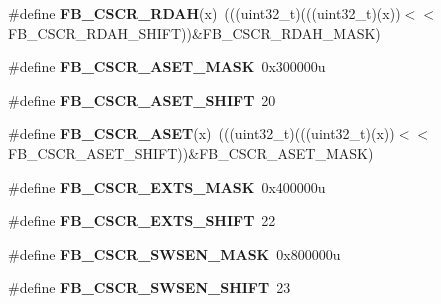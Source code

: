 \begin{DoxyCompactItemize}
\item 
\#define {\bfseries F\+B\+\_\+\+C\+S\+C\+R\+\_\+\+R\+D\+AH}(x)~(((uint32\+\_\+t)(((uint32\+\_\+t)(x))$<$$<$F\+B\+\_\+\+C\+S\+C\+R\+\_\+\+R\+D\+A\+H\+\_\+\+S\+H\+I\+FT))\&F\+B\+\_\+\+C\+S\+C\+R\+\_\+\+R\+D\+A\+H\+\_\+\+M\+A\+SK)\hypertarget{group__FB__Register__Masks_ga54849fb23896ad9ddd312de4bb8d0a09}{}\label{group__FB__Register__Masks_ga54849fb23896ad9ddd312de4bb8d0a09}

\item 
\#define {\bfseries F\+B\+\_\+\+C\+S\+C\+R\+\_\+\+A\+S\+E\+T\+\_\+\+M\+A\+SK}~0x300000u\hypertarget{group__FB__Register__Masks_gaef9bac6317316a7b6d4e2df3526b206f}{}\label{group__FB__Register__Masks_gaef9bac6317316a7b6d4e2df3526b206f}

\item 
\#define {\bfseries F\+B\+\_\+\+C\+S\+C\+R\+\_\+\+A\+S\+E\+T\+\_\+\+S\+H\+I\+FT}~20\hypertarget{group__FB__Register__Masks_ga287d608bea3c47b85bdd3d707460da64}{}\label{group__FB__Register__Masks_ga287d608bea3c47b85bdd3d707460da64}

\item 
\#define {\bfseries F\+B\+\_\+\+C\+S\+C\+R\+\_\+\+A\+S\+ET}(x)~(((uint32\+\_\+t)(((uint32\+\_\+t)(x))$<$$<$F\+B\+\_\+\+C\+S\+C\+R\+\_\+\+A\+S\+E\+T\+\_\+\+S\+H\+I\+FT))\&F\+B\+\_\+\+C\+S\+C\+R\+\_\+\+A\+S\+E\+T\+\_\+\+M\+A\+SK)\hypertarget{group__FB__Register__Masks_gaa264e82012f6dff6f57409006aeb7f81}{}\label{group__FB__Register__Masks_gaa264e82012f6dff6f57409006aeb7f81}

\item 
\#define {\bfseries F\+B\+\_\+\+C\+S\+C\+R\+\_\+\+E\+X\+T\+S\+\_\+\+M\+A\+SK}~0x400000u\hypertarget{group__FB__Register__Masks_ga1bc7960fd554faa076ba6e34fddaf081}{}\label{group__FB__Register__Masks_ga1bc7960fd554faa076ba6e34fddaf081}

\item 
\#define {\bfseries F\+B\+\_\+\+C\+S\+C\+R\+\_\+\+E\+X\+T\+S\+\_\+\+S\+H\+I\+FT}~22\hypertarget{group__FB__Register__Masks_ga095a10ba51cbcdf10aca9bf9d5692613}{}\label{group__FB__Register__Masks_ga095a10ba51cbcdf10aca9bf9d5692613}

\item 
\#define {\bfseries F\+B\+\_\+\+C\+S\+C\+R\+\_\+\+S\+W\+S\+E\+N\+\_\+\+M\+A\+SK}~0x800000u\hypertarget{group__FB__Register__Masks_ga38d5806081b68b58dff2b73abcab4d1a}{}\label{group__FB__Register__Masks_ga38d5806081b68b58dff2b73abcab4d1a}

\item 
\#define {\bfseries F\+B\+\_\+\+C\+S\+C\+R\+\_\+\+S\+W\+S\+E\+N\+\_\+\+S\+H\+I\+FT}~23\hypertarget{group__FB__Register__Masks_gad89987be24118d73c55bf5e97ab5e8d7}{}\label{group__FB__Register__Masks_gad89987be24118d73c55bf5e97ab5e8d7}


\end{DoxyCompactItemize}
